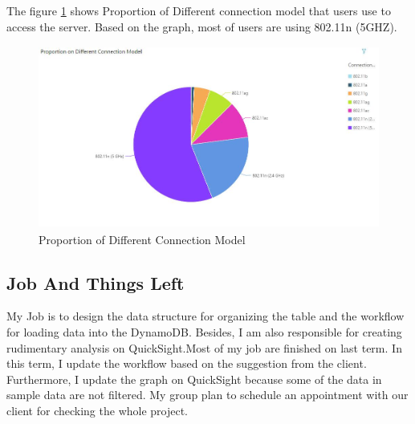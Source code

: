 \noindent The figure \ref{fig:5} shows Proportion of Different connection model that users use to access the server. Based on the graph, most of users are using 802.11n (5GHZ).

\begin{figure}[H]
\includegraphics[width=17cm, height=6cm]{4.jpg}
\centering
\caption{\label{fig:5}Proportion of Different Connection Model}
\end{figure}

 \subsection{Job And Things Left}
 	My Job is to design the data structure for organizing the table and the workflow for loading data into the DynamoDB. Besides, I am also responsible for creating rudimentary analysis on QuickSight.Most of my job are finished on last term. In this term, I update the workflow based on the suggestion from the client. Furthermore, I update the graph on QuickSight because some of the data in sample data are not filtered. My group plan to schedule an appointment with our client for checking the whole project.
 
 
 
 
	